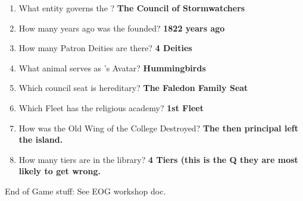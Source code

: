 \documentclass[green]{GL2020}
\begin{document}
\begin{enumerate}
\begin{enumerate}
		\item What entity governs the \pShip{}? \textbf{The Council of Stormwatchers}
		\item How many years ago was the \pSchool{} founded? \textbf{1822 years ago}
		\item How many Patron Deities are there? \textbf{4 Deities}
		\item What animal serves as \cFarmGod{}'s Avatar? \textbf{Hummingbirds}
		\item Which \pTech{} council seat is hereditary? \textbf{The Faledon Family Seat}
		\item Which \pShip{} Fleet has the religious academy? \textbf{1st Fleet}
		\item How was the Old Wing of the College Destroyed? \textbf{The then principal left the island.}
		\item How many tiers are in the library? \textbf{4 Tiers (this is the Q they are most likely to get wrong.}
	\end{enumerate}
\end{enumerate}

{\large End of Game stuff:}
See EOG workshop doc.
\end{document}
